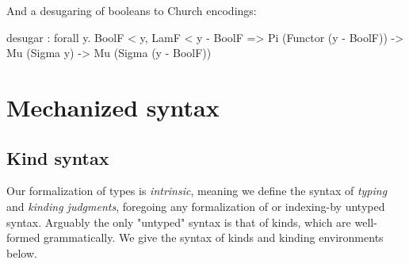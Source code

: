 \documentclass[authoryear, acmsmall, screen, review, nonacm]{acmart}
\begin{document}
\Ni And a desugaring of booleans to Church encodings:

\begin{rosi}
desugar : forall y. BoolF < y, LamF < y - BoolF =>
          Pi (Functor (y - BoolF)) -> Mu (Sigma y) -> Mu (Sigma (y - BoolF))
\end{rosi}

\section{Mechanized syntax}

\subsection{Kind syntax}

Our formalization of \Rome types is \emph{intrinsic}, meaning we define the syntax of \emph{typing} and \emph{kinding judgments}, foregoing any formalization of or indexing-by untyped syntax. Arguably the only "untyped" syntax is that of kinds, which are well-formed grammatically. We give the syntax of kinds and kinding environments below.

\begin{code}%
\>[0]\AgdaSpace{}%
\AgdaSpace{}%
\AgdaSymbol{:}\AgdaSpace{}%
\AgdaSpace{}%
\<%
\\
\>[0][@{}l@{\AgdaIndent{0}}]%
\>[2]%
\>[8]\AgdaSymbol{:}\AgdaSpace{}%
\<%
\\
%
\>[2]%
\>[8]\AgdaSymbol{:}\AgdaSpace{}%
\<%
\\
%
\>[2]\AgdaSpace{}%
\AgdaSymbol{:}\AgdaSpace{}%
\AgdaSpace{}%
\AgdaSpace{}%
\AgdaSpace{}%
\AgdaSpace{}%
\<%
\\
%
\>[2]%
\>[8]\AgdaSymbol{:}\AgdaSpace{}%
\AgdaSpace{}%
\AgdaSpace{}%
\<%
\\
%
\\[\AgdaEmptyExtraSkip]%
\>[0]\AgdaSpace{}%
\AgdaSpace{}%
\<%
\end{code}
\end{document}
